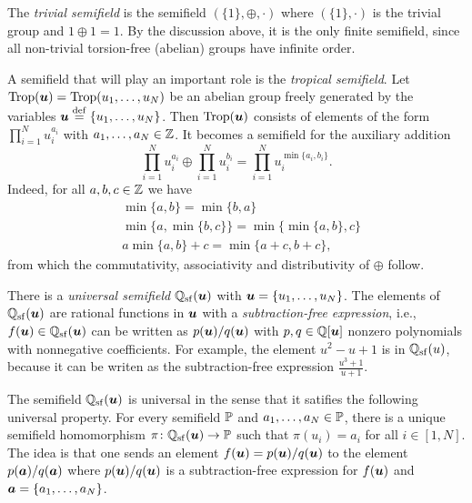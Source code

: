 \begin{example}

	The \emph{trivial semifield} is the semifield $(\{1\}, \oplus,
		\cdot)$ where $(\{1\}, \cdot)$ is the trivial group and $1 \oplus 1 = 1$. By the
	discussion above, it is the only finite semifield, since all non-trivial torsion-free
	(abelian) groups have infinite order.
\end{example}
\begin{example}

	A semifield that will play an important role is the \emph{tropical
		semifield}. Let $\operatorname{Trop}(\boldsymbol{u}) = \operatorname{Trop}(u_1, \dots, u_N)$ be an
	abelian group freely generated by the variables $\boldsymbol{u} \overset{\mathrm{def}}{=} \{u_1, \dots, u_N\}$. Then
	$\operatorname{Trop}(\boldsymbol{u})$ consists of elements of the form $\prod_{i=1}^N u_i^{a_i}$ with $a_1,
		\dots, a_N \in \mathbb{Z}$. It becomes a semifield for the auxiliary addition
	\begin{equation*}
		\prod_{i=1}^N u_i^{a_i}  \oplus \prod_{i=1}^N u_i^{b_i} =  \prod_{i=1}^N u_i^{\min\{a_i, b_i\}}.
	\end{equation*}
	Indeed, for all $a,b,c \in \mathbb{Z}$ we have
	\begin{align*}
		 & \min \{a,b \} = \min \{b, a\}                    \\
		 & \min \{a, \min\{b,c\}\} = \min\{\min\{a,b\}, c\} \\
		 & a \min \{a, b\} + c = \min\{a + c, b + c\},
	\end{align*}
	from which the commutativity, associativity and distributivity of $\oplus$ follow.

\end{example}

\begin{example}

	There is a \emph{universal semifield} $\mathbb{Q}_{{\operatorname{sf}}}(\boldsymbol{u})$
	with $\boldsymbol{u} = \{u_1, \dots, u_N\}$. The elements of $\mathbb{Q}_{\operatorname{sf}}(\boldsymbol{u})$ are rational
	functions in $\boldsymbol{u}$ with a \emph{subtraction-free expression},
	i.e., $f(\boldsymbol{u}) \in \mathbb{Q}_{\operatorname{sf}}(\boldsymbol{u})$ can be written as $p(\boldsymbol{u}) / q (\boldsymbol{u})$ with $p, q
		\in \mathbb{Q}[\boldsymbol{u}]$ nonzero polynomials with nonnegative coefficients. For example, the
	element $u^2 - u + 1$ is in $\mathbb{Q}_{\operatorname{sf}}(u)$, because it can be writen as the
	subtraction-free expression $\frac{u^3 + 1}{u + 1}$.

	The semifield $\mathbb{Q}_{{\operatorname{sf}}}(\boldsymbol{u})$ is universal in the sense that it satifies the
	following universal property. For every semifield $\mathbb{P}$ and $a_1, \dots, a_N \in
		\mathbb{P}$, there is a unique semifield homomorphism $\pi \colon \mathbb{Q}_{\operatorname{sf}}(\boldsymbol{u}) \to \mathbb{P}$
	such that $\pi(u_i) = a_i$ for all $i \in [1, N]$. The idea is that one sends an
	element $f(\boldsymbol{u}) = p(\boldsymbol{u}) / q(\boldsymbol{u})$ to the element $p(\boldsymbol{a}) / q(\boldsymbol{a})$ where $p(\boldsymbol{u})
		/ q(\boldsymbol{u})$ is a subtraction-free expression for $f(\boldsymbol{u})$ and $\boldsymbol{a} = \{a_1, \dots,
		a_N\}$.
\end{example}

